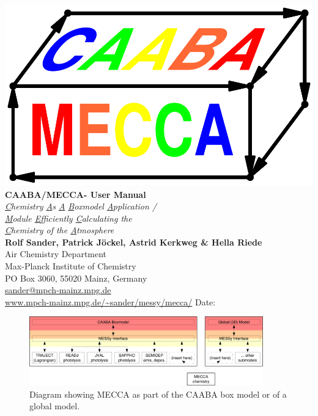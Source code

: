 \documentclass[twoside]{article}
\begin{document}
\thispagestyle{empty}

\begin{center}
  \includegraphics[height=0.3\textheight]{caaba_mecca_logo_print}\\[10mm]
  {\Huge\bf CAABA/MECCA-{\meccaversion} User Manual}\\[10mm]
  {\huge\em \underline{C}hemistry \underline{A}s \underline{A}
    \underline{B}oxmodel \underline{A}pplication /}\\[3mm]
  {\huge\em \underline{M}odule \underline{E}fficiently
    \underline{C}alculating the\\[5mm]
    \underline{C}hemistry of the
    \underline{A}tmosphere}\\[10mm]
  {\huge\bf Rolf Sander, Patrick J\"ockel, Astrid Kerkweg \& Hella
    Riede}\\[15mm]
  \Large
  Air Chemistry Department\\
  Max-Planck Institute of Chemistry\\
  PO Box 3060, 55020 Mainz, Germany\\
  \url{sander@mpch-mainz.mpg.de}\\[10mm]
  {\huge\url{www.mpch-mainz.mpg.de/~sander/messy/mecca/}}
  \vfill
  Date: \thedate
\end{center}

\clearpage

\setlength{\columnsep}{8mm}
\twocolumn\sloppy

\tableofcontents

\begin{figure}[htb]
  \begin{center}
  \includegraphics[width=0.9\textwidth]{modular-mecca}
  \end{center}
  \caption{Diagram showing MECCA as part of the CAABA box model or of a
    global model.}
  \label{fig:modular-mecca}
\end{figure}
\end{document}
